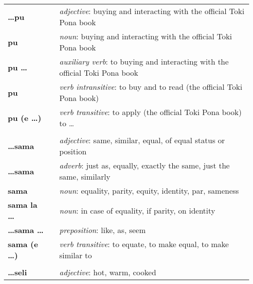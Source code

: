 \begin{supertabular}{p{2,5cm}|ll}
    \textbf{\dots pu}            &  & \textit{adjective}: buying and interacting with the official Toki Pona book                                \\
    \textbf{pu}                  &  & \textit{noun}: buying and interacting with the official Toki Pona book                                     \\
    \textbf{pu \dots}            &  & \textit{auxiliary verb}: to buying and interacting with the official Toki Pona book                        \\
    \textbf{pu}                  &  & \textit{verb intransitive}:  to buy and to read (the official Toki Pona book)                              \\
    \textbf{pu (e \dots)}        &  & \textit{verb transitive}: to apply (the official Toki Pona book) to \dots                                  \\
                                 &  &                                                                                                            \\
    \textbf{\dots sama}          &  & \textit{adjective}: same, similar, equal, of equal status or position                                      \\
    \textbf{\dots sama}          &  & \textit{adverb}: just as, equally, exactly the same, just the same, similarly                              \\
    \textbf{sama}                &  & \textit{noun}: equality, parity, equity, identity, par, sameness                                           \\
    \textbf{sama la \dots}       &  & \textit{noun}: in case of equality, if parity, on identity                                                 \\
    \textbf{\dots sama \dots}    &  & \textit{preposition}: like, as, seem                                                                       \\
    \textbf{sama (e \dots)}      &  & \textit{verb transitive}: to equate, to make equal, to make similar to                                     \\
                                 &  &                                                                                                            \\
    \textbf{\dots seli}          &  & \textit{adjective}: hot, warm, cooked                                                                      \\

\end{supertabular}
